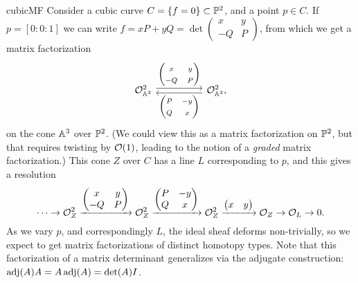 
\begin{example}{}{cubicMF}
    Consider a cubic curve $C=\{f=0\}\subset\P^2$, and a point $p\in C$. If
    $p=[0:0:1]$ we can write $f=xP+yQ=\det\begin{pmatrix}
        x & y \\ -Q & P
    \end{pmatrix}$, from which we get a matrix factorization
    \begin{equation*}
        \begin{tikzcd}[ampersand replacement=\&,column sep=huge]
            \O_{\A^3}^2 \ar[shift left]{r}{\begin{pmatrix}
                    x & y \\ -Q & P
            \end{pmatrix}} \&
            \O_{\A^3}^2, \ar[shift left]{l}{\begin{pmatrix}
                    P & -y \\ Q & x
            \end{pmatrix}}
        \end{tikzcd}
    \end{equation*}
    on the cone $\A^3$ over $\P^2$. (We could view this as a matrix
    factorization on $\P^2$, but that requires twisting by $\O(1)$, leading to
    the notion of a \emph{graded} matrix factorization.) This cone $Z$ over $C$
    has a line $L$ corresponding to $p$, and this gives a resolution
    \begin{equation*}
        \cdots \to
        \O_Z^2 \xrightarrow{\begin{pmatrix}
                x & y \\ -Q & P
        \end{pmatrix}}
        \O_Z^2 \xrightarrow{\begin{pmatrix}
                P & -y \\ Q & x
        \end{pmatrix}}
        \O_Z^2 \xrightarrow{\begin{pmatrix}
            x & y
        \end{pmatrix}} \O_Z \to \O_L \to 0.
    \end{equation*}
    As we vary $p$, and correspondingly $L$, the ideal sheaf deforms
    non-trivially, so we expect to get matrix factorizations of distinct
    homotopy types. Note that this factorization of a matrix determinant
    generalizes via the adjugate construction: $\adj(A)A=A\adj(A)=\det(A)I$.
\end{example}

